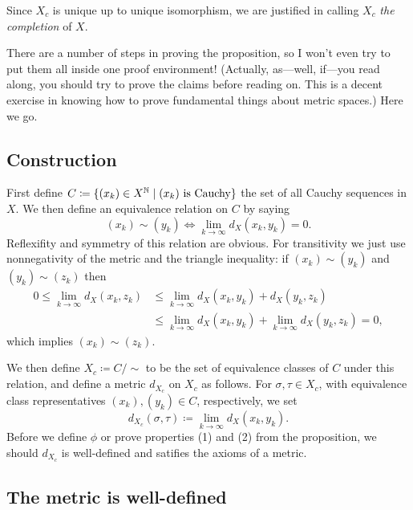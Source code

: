 \begin{definition}
  Since $X_c$ is unique up to unique isomorphism, we are justified in
  calling $X_c$ \textit{the completion} of $X$.
\end{definition}

There are a number of steps in proving the proposition, so I won't
even try to put them all inside one proof environment! (Actually,
as---well, if---you read along, you should try to prove the claims
before reading on. This is a decent exercise in knowing how to prove
fundamental things about metric spaces.) Here we go.


\subsection{Construction}

First define $C \coloneqq \{(x_k) \in X^{\mathbb{N}} \mid (x_k)\text{ is
  Cauchy}\}$ the set of all Cauchy sequences in $X$. We then define an
equivalence relation on $C$ by saying
\[
(x_k) \sim (y_k) \iff \lim_{k \to \infty} d_X(x_k,y_k) = 0.
\]
Reflexifity and symmetry of this relation are obvious. For
transitivity we just use nonnegativity of the metric and the triangle
inequality: if $(x_k) \sim (y_k)$ and $(y_k) \sim (z_k)$ then
\begin{align*}
0 \le \lim_{k \to \infty} d_X(x_k,z_k) &\le \lim_{k \to \infty}
d_X(x_k,y_k) + d_X(y_k,z_k) \\ &\le \lim_{k \to \infty} d_X(x_k,y_k) +
\lim_{k \to \infty} d_X(y_k,z_k) = 0,
\end{align*}
which implies $(x_k) \sim (z_k)$.

\medskip
We then define $X_c \coloneqq C/{\sim}$ to be the set of equivalence
classes of $C$ under this relation, and define a metric $d_{X_c}$ on
$X_c$ as follows. For $\sigma, \tau \in X_c$, with equivalence class
representatives $(x_k), (y_k) \in C$, respectively, we set
\[
d_{X_c}(\sigma, \tau) \coloneqq \lim_{k \to \infty} d_X(x_k, y_k).
\]
Before we define $\phi$ or prove properties (1) and (2) from the
proposition, we should $d_{X_c}$ is well-defined and satifies the
axioms of a metric.


\subsection{The metric is well-defined}

